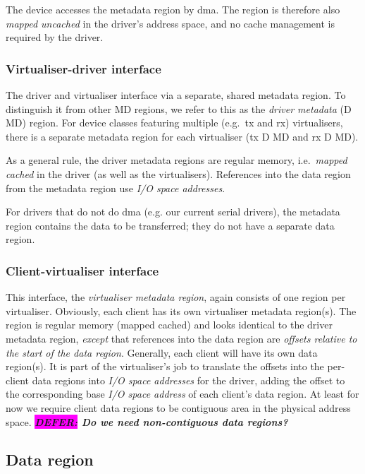 \documentclass[a4paper,12pt]{report}
\newcommand{\DEFER}[1]{\textbf{\textsl{\colorbox{magenta}{DEFER:} #1}}}
\newcommand{\DEFER}[1]{\relax}
\begin{document}
The device accesses the metadata region by \gls{dma}. The region is
therefore also \emph{mapped uncached} in the driver's address space,
and no cache management is required by the driver.

\subsubsection{Virtualiser-driver interface}

The driver and virtualiser interface via a separate, shared
metadata region. To distinguish it from other MD regions, we
refer to this as the \emph{driver metadata} (D MD) region.
For device classes featuring multiple
(e.g.\ \gls{tx} and \gls{rx}) virtualisers, there is a separate metadata region
for each virtualiser (\gls{tx} D MD and \gls{rx} D MD).

As a general rule, the driver metadata regions are regular memory, i.e.\
\emph{mapped cached} in the driver (as well as the virtualisers). References
into the data region from the metadata region use \emph{I/O space addresses}.

For drivers that do not do \gls{dma} (e.g. our current serial drivers), the
metadata region contains the data to be transferred; they do not have
a separate data region.

\subsubsection{Client-virtualiser interface}

This interface, the \emph{virtualiser metadata region}, again consists
of one region per virtualiser. Obviously, each client has its own
virtualiser metadata region(s). The region is
regular memory (mapped cached) and looks identical to the
driver metadata region, \emph{except} that references into the data region are
\emph{offsets relative to the start of the data region}.  Generally,
each client will have its own data region(s). It is part of
the virtualiser's job to translate the offsets into the per-client
data regions into \emph{I/O space
  addresses} for the driver, adding the offset to the corresponding
base \emph{I/O space address} of each client's data
region. At least for now we require client data regions to be
contiguous area in the physical address space.
\DEFER{Do we need non-contiguous data regions?}


\subsection{Data region}\label{s:buf-states}
\end{document}

